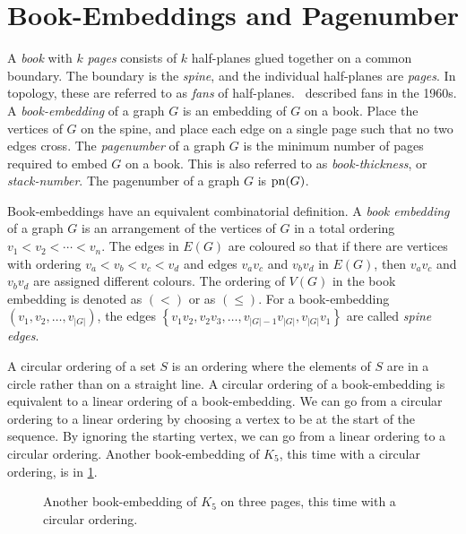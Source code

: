 \section{Book-Embeddings and Pagenumber}\label{sec:Book Embedding}
A \textit{book} with \(k\) \textit{pages} consists of \(k\) half-planes glued together on a common boundary. The boundary is the \textit{spine}, and the individual half-planes are \textit{pages}. In topology, these are referred to as \textit{fans} of half-planes.\ \textcite{persingerSubsetsNbooksE31966,atneosenOnedimensionalNleavedContinua1972} described fans in the 1960s.
A \textit{book-embedding} of a graph \(G\) is an embedding of \(G\) on a book. Place the vertices of \(G\) on the spine, and place each edge on a single page such that no two edges cross.
The \textit{pagenumber} of a graph \(G\) is the minimum number of pages required to embed \(G\) on a book. This is also referred to as \textit{book-thickness}, or \textit{stack-number}. The pagenumber of a graph $G$ is $\operatorname{pn}(G)$.

Book-embeddings have an equivalent combinatorial definition. A \textit{book embedding} of a graph \(G\) is an arrangement of the vertices of \(G\) in a total ordering \(v_1 < v_2 < \cdots < v_n\). The edges in \(E(G)\) are coloured so that if there are vertices with ordering \(v_a < v_b < v_c < v_d\) and edges \(v_a v_c\) and \(v_b v_d\) in $E(G)$, then $v_a v_c$ and $v_b v_d$ are assigned different colours.
The ordering of \(V(G)\) in the book embedding is denoted as \((<)\) or as \((\leq)\). For a book-embedding \((v_1, v_2, \ldots, v_{|G|})\), the edges \( \left\{ v_1 v_2, v_2 v_3, \ldots, v_{|G| - 1}v_{|G|}, v_{|G|}v_{1} \right\} \) are called \textit{spine edges}.

A circular ordering of a set $S$ is an ordering where the elements of $S$ are in a circle rather than on a straight line. A circular ordering of a book-embedding is equivalent to a linear ordering of a book-embedding. We can go from a circular ordering to a linear ordering by choosing a vertex to be at the start of the sequence. By ignoring the starting vertex, we can go from a linear ordering to a circular ordering. Another book-embedding of $K_5$, this time with a circular ordering, is in \cref{fig:circular_book-embedding}.

\begin{figure}[h!]
	\centering
	
	\caption[Three-page circular book-embedding of $K_5$]{Another book-embedding of $K_5$ on three pages, this time with a circular ordering.}\label{fig:circular_book-embedding}
\end{figure}

